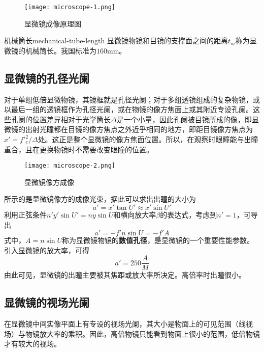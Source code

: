 \documentclass[cn,10pt,chinesefont=founder,math=mtpro2,cite=super,toc=onecol,twoside,openany]{elegantbook}
\begin{document}
\begin{figure}[htbp]
	\centering
	\texttt{[image: microscope-1.png]}
	\caption{显微镜成像原理图}
	\label{fig:microscope-1}
\end{figure}

\begin{definition}{机械筒长}{mechanical-tube-length}
	显微镜物镜和目镜的支撑面之间的距离$t_m$称为显微镜的机械筒长。我国标准为$160\mathrm{mm}$。
\end{definition}

\subsection{显微镜的孔径光阑}
对于单组低倍显微物镜，其镜框就是孔径光阑；对于多组透镜组成的复杂物镜，或以最后一组的透镜框作为孔径光阑，或在物镜的像方焦面上或其附近专设孔阑。这些孔阑的位置差异相对于光学筒长$\varDelta$是一个小量，因此孔阑被目镜所成的像，即显微镜的出射光瞳都在目镜的像方焦点之外近乎相同的地方，即距目镜像方焦点为$x'=f'^2_e/\varDelta$处。这正是整个显微镜的像方焦面位置。所以，在观察时眼瞳能与出瞳重合，且在更换物镜时不需要改变眼瞳的位置。

\begin{figure}[htbp]
	\centering
	\texttt{[image: microscope-2.png]}
	\caption{显微镜像方成像}
	\label{fig:microscope-2}
\end{figure}

 所示的是显微镜像方的成像光束，据此可以求出出瞳的大小为
\begin{equation}
a'=x'\tan U'\approx x'\sin U'
\end{equation}
利用正弦条件$n'y'\sin U'=ny\sin U$和横向放大率$\beta$的表达式，考虑到$n'=1$，可导出
\begin{equation}
a'=-f'n\sin U=-f'A
\end{equation}
式中，$A=n\sin U$称为显微镜物镜的\textbf{数值孔径}，是显微镜的一个重要性能参数。引入显微镜的放大率，可得
\begin{equation}
a'=250\frac{A}{M}
\end{equation}
由此可见，显微镜的出瞳主要被其焦距或放大率所决定。高倍率时出瞳很小。

\subsection{显微镜的视场光阑}
在显微镜中间实像平面上有专设的视场光阑，其大小是物面上的可见范围（线视场）与物镜放大率的乘积。因此，高倍物镜只能看到物面上很小的范围，低倍物镜才有较大的视场。
\end{document}
